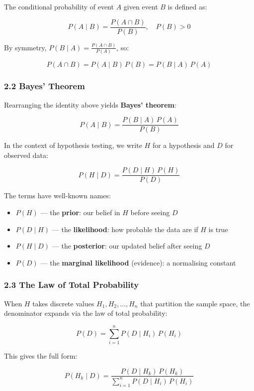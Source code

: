 \documentclass[
]{article}
\providecommand{\tightlist}{%
  \setlength{\itemsep}{0pt}\setlength{\parskip}{0pt}}
\begin{document}
The conditional probability of event \(A\) given event \(B\) is defined
as:

\[P(A \mid B) = \frac{P(A \cap B)}{P(B)}, \quad P(B) > 0\]

By symmetry, \(P(B \mid A) = \frac{P(A \cap B)}{P(A)}\), so:

\[P(A \cap B) = P(A \mid B)\,P(B) = P(B \mid A)\,P(A)\]

\hypertarget{bayes-theorem}{%
\subsubsection{2.2 Bayes' Theorem}\label{bayes-theorem}}

Rearranging the identity above yields \textbf{Bayes' theorem}:

\[\boxed{P(A \mid B) = \frac{P(B \mid A)\,P(A)}{P(B)}}\]

In the context of hypothesis testing, we write \(H\) for a hypothesis
and \(D\) for observed data:

\[P(H \mid D) = \frac{P(D \mid H)\,P(H)}{P(D)}\]

The terms have well-known names:

\begin{itemize}
\tightlist
\item
  \(P(H)\) --- the \textbf{prior}: our belief in \(H\) before seeing
  \(D\)
\item
  \(P(D \mid H)\) --- the \textbf{likelihood}: how probable the data are
  if \(H\) is true
\item
  \(P(H \mid D)\) --- the \textbf{posterior}: our updated belief after
  seeing \(D\)
\item
  \(P(D)\) --- the \textbf{marginal likelihood} (evidence): a
  normalising constant
\end{itemize}

\hypertarget{the-law-of-total-probability}{%
\subsubsection{2.3 The Law of Total
Probability}\label{the-law-of-total-probability}}

When \(H\) takes discrete values \(H_1, H_2, \ldots, H_n\) that
partition the sample space, the denominator expands via the law of total
probability:

\[P(D) = \sum_{i=1}^{n} P(D \mid H_i)\,P(H_i)\]

This gives the full form:

\[P(H_k \mid D) = \frac{P(D \mid H_k)\,P(H_k)}{\displaystyle\sum_{i=1}^{n} P(D \mid H_i)\,P(H_i)}\]
\end{document}
